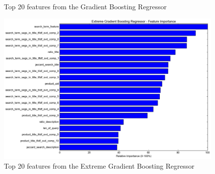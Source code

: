 \documentclass[twoside,12pt]{article}
\begin{document}
\begin{itemize}
\begin{figure}[!htbp]
	\caption{Top 20 features from the Gradient Boosting Regressor}
	\label{top_feat_gbr}
\end{figure}
\begin{figure}[!htbp]
\centering
\includegraphics[scale=.43]{DataVisualization/xgbr_fp.png} 
\caption{Top 20 features from the Extreme Gradient Boosting Regressor}
\label{top_feat_xgbr}
\end{figure}

\end{itemize}


\FloatBarrier
\end{document}

